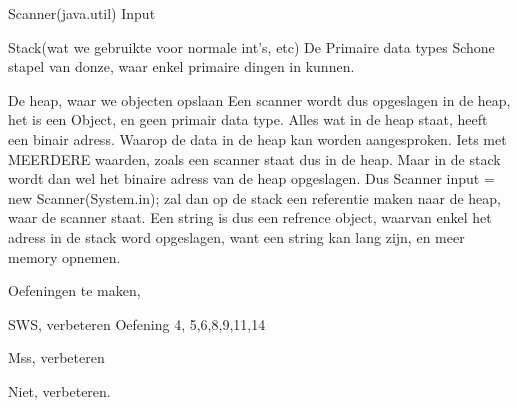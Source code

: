 
Scanner(java.util)
Input

Stack(wat we gebruikte voor normale int's, etc) De Primaire data types
Schone stapel van donze, waar enkel primaire dingen in kunnen.

De heap, waar we objecten opslaan
Een scanner wordt dus opgeslagen in de heap, het is een Object, en geen primair data type.
Alles wat in de heap staat, heeft een binair adress. Waarop de data in de heap kan worden aangesproken. 
Iets met MEERDERE waarden, zoals een scanner staat dus in de heap.
Maar in de stack wordt dan wel het binaire adress van de heap opgeslagen.
Dus Scanner input = new Scanner(System.in); zal dan op de stack een referentie maken naar de heap, waar de scanner staat.
Een string is dus een refrence object, waarvan enkel het adress in de stack word opgeslagen, want een string kan lang zijn, en meer memory opnemen. 


Oefeningen te maken, 

SWS, verbeteren
Oefening 4, 5,6,8,9,11,14

Mss, verbeteren


Niet, verbeteren.

